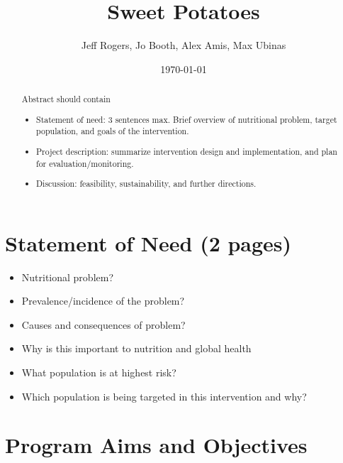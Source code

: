 \documentclass[12pt, letterpaper, draft]{article}
\begin{document}
\title{Sweet Potatoes}
\author{Jeff Rogers, Jo Booth, Alex Amis, Max Ubinas}
\date{\today}
\maketitle


\begin{abstract}
Abstract should contain
\begin{itemize}
    \item Statement of need: 3 sentences max. Brief overview of nutritional
    problem, target population, and goals of the intervention.
    \item Project description: summarize intervention design and implementation,
    and plan for evaluation/monitoring.
    \item Discussion: feasibility, sustainability, and further directions.
\end{itemize}
\end{abstract}

\section{Statement of Need (2 pages)}
\begin{itemize}
    \item Nutritional problem?
    \item Prevalence/incidence of the problem?
    \item Causes and consequences of problem?
    \item Why is this important to nutrition and global health
    \item What population is at highest risk?
    \item Which population is being targeted in this intervention and why?
\end{itemize}

\section{Program Aims and Objectives} %
\end{document}

